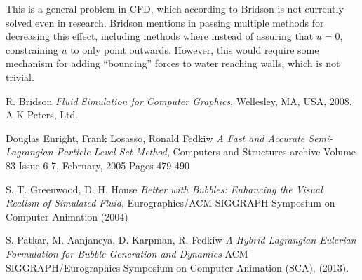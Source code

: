 \documentclass[twocolumn]{article}
\begin{document}
This is a general problem in CFD, which according to Bridson\cite{fluidBook} is not currently solved even in research. Bridson mentions in passing multiple methods for decreasing this effect, including methods where instead of assuring that $u = 0$, constraining $u$ to only point outwards. However, this would require some mechanism for adding ``bouncing'' forces to water reaching walls, which is not trivial.

\begin{thebibliography}{9}
        R. Bridson
        \emph{Fluid Simulation for Computer Graphics},
        Wellesley, MA, USA, 2008. A K Peters, Ltd.

        Douglas Enright, Frank Losasso, Ronald Fedkiw
        \emph{A Fast and Accurate Semi-Lagrangian Particle Level Set Method},
        Computers and Structures archive
        Volume 83 Issue 6-7, February, 2005 
        Pages 479-490 


        S. T. Greenwood, D. H. House
        \emph{Better with Bubbles: Enhancing the Visual Realism of Simulated Fluid},
        Eurographics/ACM SIGGRAPH Symposium on Computer Animation (2004)
        
      S. Patkar, M. Aanjaneya, D. Karpman, R. Fedkiw
        \emph{A Hybrid Lagrangian-Eulerian Formulation for Bubble Generation and Dynamics}
         ACM SIGGRAPH/Eurographics Symposium on Computer Animation (SCA), (2013).
        
\end{thebibliography}
\end{document}
